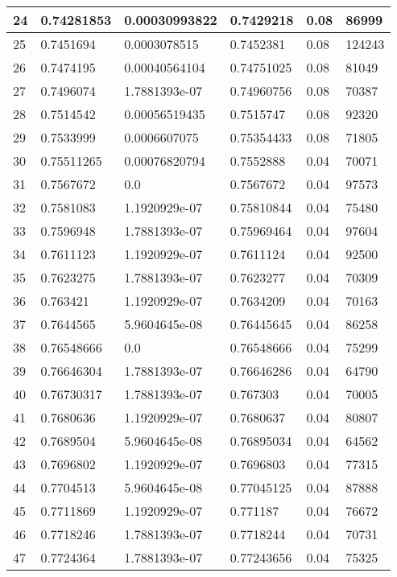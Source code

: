 \begin{longtable}{|l|l|l|l|l|l|}
24 & 0.74281853 & 0.00030993822 & 0.7429218 & 0.08 & 86999 \\ \hline 
25 & 0.7451694 & 0.0003078515 & 0.7452381 & 0.08 & 124243 \\ \hline 
26 & 0.7474195 & 0.00040564104 & 0.74751025 & 0.08 & 81049 \\ \hline 
27 & 0.7496074 & 1.7881393e-07 & 0.74960756 & 0.08 & 70387 \\ \hline 
28 & 0.7514542 & 0.00056519435 & 0.7515747 & 0.08 & 92320 \\ \hline 
29 & 0.7533999 & 0.0006607075 & 0.75354433 & 0.08 & 71805 \\ \hline 
30 & 0.75511265 & 0.00076820794 & 0.7552888 & 0.04 & 70071 \\ \hline 
31 & 0.7567672 & 0.0 & 0.7567672 & 0.04 & 97573 \\ \hline 
32 & 0.7581083 & 1.1920929e-07 & 0.75810844 & 0.04 & 75480 \\ \hline 
33 & 0.7596948 & 1.7881393e-07 & 0.75969464 & 0.04 & 97604 \\ \hline 
34 & 0.7611123 & 1.1920929e-07 & 0.7611124 & 0.04 & 92500 \\ \hline 
35 & 0.7623275 & 1.7881393e-07 & 0.7623277 & 0.04 & 70309 \\ \hline 
36 & 0.763421 & 1.1920929e-07 & 0.7634209 & 0.04 & 70163 \\ \hline 
37 & 0.7644565 & 5.9604645e-08 & 0.76445645 & 0.04 & 86258 \\ \hline 
38 & 0.76548666 & 0.0 & 0.76548666 & 0.04 & 75299 \\ \hline 
39 & 0.76646304 & 1.7881393e-07 & 0.76646286 & 0.04 & 64790 \\ \hline 
40 & 0.76730317 & 1.7881393e-07 & 0.767303 & 0.04 & 70005 \\ \hline 
41 & 0.7680636 & 1.1920929e-07 & 0.7680637 & 0.04 & 80807 \\ \hline 
42 & 0.7689504 & 5.9604645e-08 & 0.76895034 & 0.04 & 64562 \\ \hline 
43 & 0.7696802 & 1.1920929e-07 & 0.7696803 & 0.04 & 77315 \\ \hline 
44 & 0.7704513 & 5.9604645e-08 & 0.77045125 & 0.04 & 87888 \\ \hline 
45 & 0.7711869 & 1.1920929e-07 & 0.771187 & 0.04 & 76672 \\ \hline 
46 & 0.7718246 & 1.7881393e-07 & 0.7718244 & 0.04 & 70731 \\ \hline 
47 & 0.7724364 & 1.7881393e-07 & 0.77243656 & 0.04 & 75325 \\ \hline 

\end{longtable}
